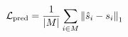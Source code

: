 \documentclass[preview]{standalone}
\begin{document}
\begin{align*}
\special{dvisvgm:raw <g id='unique000'>}\mathcal{L}_{\mathrm{pred}}=\frac{1}{|M|}\sum_{i\in M}\left\|\hat{s}_i-s_i\right\|_1\special{dvisvgm:raw </g>}
\end{align*}
\end{document}
